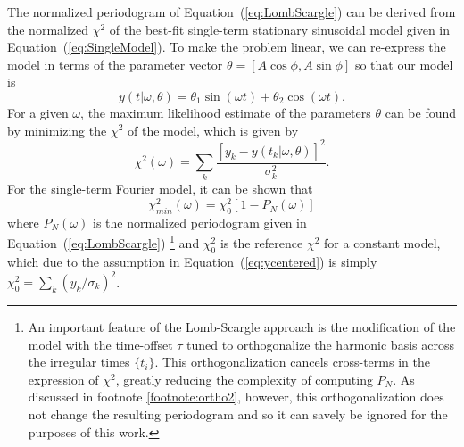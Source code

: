 \documentclass{emulateapj}
\newcommand{\Eq}[1]{Equation~(\ref{eq:#1})}
\newcommand{\eq}[1]{\Eq{#1}}
\newcommand{\eqlabel}[1]{\label{eq:#1}}
\newcommand{\new}[1]{{\color{red} #1}}
\begin{document}
The normalized periodogram of \eq{LombScargle} can be derived from the normalized $\chi^2$ of the best-fit single-term stationary sinusoidal model given in \eq{SingleModel}. To make the problem linear, we can re-express the model in terms of the parameter vector $\theta = [A\cos\phi, A\sin\phi]$ so that our model is
\begin{equation}
  \eqlabel{simplemodel}
  y(t|\omega,\theta) = \theta_1\sin(\omega t) + \theta_2\cos(\omega t).
\end{equation}
For a given $\omega$, the maximum likelihood estimate of the parameters $\theta$ can be found by minimizing the $\chi^2$ of the model, which is given by
\begin{equation}
  \chi^2(\omega) = \sum_k \frac{[y_k - y(t_k|\omega,\theta)]^2}{\sigma_k^2}.
\end{equation}
For the single-term Fourier model, it can be shown \citep[see, e.g.][]{ICVG2014} that
\begin{equation}
  \eqlabel{chi2PN}
  \chi_{min}^2(\omega) = \chi^2_0[1 - P_N(\omega)]
\end{equation}
where $P_N(\omega)$ is the normalized periodogram given in \eq{LombScargle}\new{\footnote{\new{An important feature of the Lomb-Scargle approach is the modification of the model with the time-offset $\tau$ tuned to orthogonalize the harmonic basis across the irregular times $\{t_i\}$. This orthogonalization cancels cross-terms in the expression of $\chi^2$, greatly reducing the complexity of computing $P_N$. As discussed in footnote \ref{footnote:ortho2}, however, this orthogonalization does not change the resulting periodogram and so it can savely be ignored for the purposes of this work.}}\label{footnote:ortho1}}
and $\chi^2_0$ is the reference $\chi^2$ for a constant model, which due to the assumption in \eq{ycentered} is simply $\chi^2_0 = \sum_k (y_k/\sigma_k)^2$.
\end{document}
